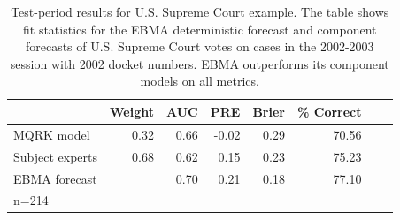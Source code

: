\documentclass[12pt,fullpage,endnotes]{article}
\begin{document}
\begin{table}[p]
  \caption{\footnotesize Test-period results for U.S. Supreme Court
    example.  The table shows fit statistics for the EBMA deterministic
    forecast and component forecasts of U.S. Supreme Court votes on
    cases in the 2002-2003 session with 2002 docket numbers.   EBMA 
    outperforms its component models on all metrics. }
\label{SC-Res} \small
\begin{center}
\begin{tabular}{lrrrrrrr}
\toprule
 & Weight & AUC & PRE & Brier & \% Correct   \\ 
\midrule
MQRK model& 0.32  &0.66 & -0.02 & 0.29 & 70.56  \\ 
Subject experts & 0.68 &0.62 & 0.15 & 0.23 & 75.23 \\ 
EBMA forecast&  & 0.70 & 0.21 & 0.18 & 77.10  \\ 
\bottomrule
n=214 
\end{tabular}
\end{center}
\end{table}

\clearpage
\end{document}
